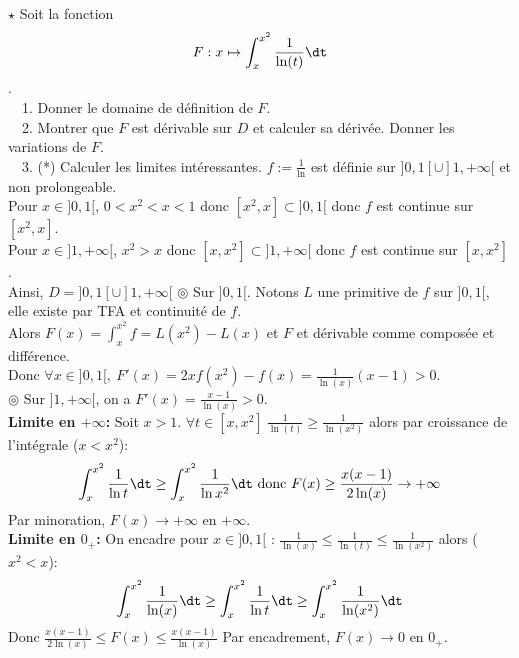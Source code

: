 \documentclass[11pt]{article}
\begin{document}
\begin{ex}{$\star$}{}
    Soit la fonction \begin{equation*}F:x\mapsto\int_x^{x^2}\frac{1}{\ln(t)}\dt\end{equation*}.\\
    \-\ ~1. Donner le domaine de définition de $F$.\\
    \-\ ~2. Montrer que $F$ est dérivable sur $D$ et calculer sa dérivée. Donner les variations de $F$.\\
    \-\ ~3. (*) Calculer les limites intéressantes.
    \tcblower
     $f:=\frac{1}{\ln}$ est définie sur $]0,1[\cup]1,+\infty[$ et non prolongeable.\\
    Pour $x\in]0,1[$, $0<x^2<x<1$ donc $[x^2,x]\subset]0,1[$ donc $f$ est continue sur $[x^2,x]$.\\
    Pour $x\in]1,+\infty[$, $x^2>x$ donc $[x,x^2]\subset]1,+\infty[$ donc $f$ est continue sur $[x,x^2]$.\\
    Ainsi, $D=]0,1[\cup]1,+\infty[$\n
     $\circledcirc$ Sur $]0,1[$. Notons $L$ une primitive de $f$ sur $]0,1[$, elle existe par TFA et continuité de $f$.\\
    Alors $F(x)=\int_x^{x^2}f=L(x^2)-L(x)$ et $F$ et dérivable comme composée et différence.\\
    Donc $\forall x \in ]0,1[, ~ F'(x)=2xf(x^2) - f(x)=\frac{1}{\ln(x)}(x-1)>0$.\\
    $\circledcirc$ Sur $]1,+\infty[$, on a $F'(x)=\frac{x-1}{\ln(x)}>0$.\\
     \textbf{Limite en $+\infty$:} Soit $x>1$. $\forall t\in[x,x^2] ~ \frac{1}{\ln(t)}\geq\frac{1}{\ln(x^2)}$ alors par croissance de l'intégrale ($x<x^2$):
    \begin{equation*}
        \int_x^{x^2}\frac{1}{\ln t}\dt\geq\int_x^{x^2}\frac{1}{\ln x^2}\dt \text{ donc } F(x)\geq\frac{x(x-1)}{2\ln(x)}\to+\infty
    \end{equation*}
    Par minoration, $F(x)\to+\infty$ en $+\infty$.\\
    \textbf{Limite en $0_+$:} On encadre pour $x\in]0,1[$ : $\frac{1}{\ln(x)}\leq\frac{1}{\ln(t)}\leq\frac{1}{\ln(x^2)}$ alors ($x^2<x$):
    \begin{equation*}
        \int_x^{x^2}\frac{1}{\ln(x)}\dt\geq\int_x^{x^2}\frac{1}{\ln t}\dt\geq\int_x^{x^2}\frac{1}{\ln(x^2)}\dt
    \end{equation*}
    Donc $\frac{x(x-1)}{2\ln(x)} \leq F(x)\leq \frac{x(x-1)}{\ln(x)}$ Par encadrement, $F(x)\to0$ en $0_+$.\\

\end{ex}
\end{document}

